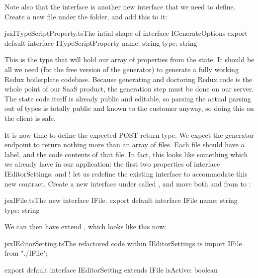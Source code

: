 \documentclass[paper=6in:9in,pagesize=pdftex,headinclude=on,footinclude=on,12pt,twoside]{scrbook}
\begin{document}
Note also that the interface  is another new interface that we need to define. Create a new file  under the  folder, and add this to it:

\begin{codeInput}{jsx}{ITypeScriptProperty.ts}{The intial shape of interface IGenerateOptions}
export default interface ITypeScriptProperty {
  name: string
  type: string
}
\end{codeInput}

This is the type that will hold our array of properties from the state. It should be all we need (for the free version of the generator) to generate a fully working Redux boilerplate codebase. Because generating and doctoring Redux code is the whole point of our SaaS product, the generation step must be done on our server. The state code itself is already public and editable, so parsing the actual parsing out of types is totally public and known to the customer anyway, so doing this on the client is safe.

It is now time to define the expected POST return type. We expect the generator endpoint to return nothing more than an array of files. Each file should have a label, and the code contents of that file. In fact, this looks like something which we already have in our application: the first two properties of interface {IEditorSettings}:  and ! let us redefine the existing  interface to accommodate this new contract. Create a new interface under  called , and move both  and  from  to :

\begin{codeInput}{jsx}{IFile.ts}{The new interface IFile.}
export default interface IFile {
  name: string
  type: string
}
\end{codeInput}

We can then have  extend , which looks like this now:

\begin{codeInput}{jsx}{IEditorSetting.ts}{The refactored code within IEditorSettings.ts}
import IFile from "./IFile";

export default interface IEditorSetting extends IFile {
  isActive: boolean
}  
\end{codeInput}
\end{document}
